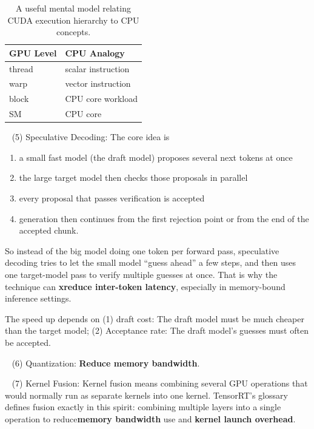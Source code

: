 \documentclass[11pt]{article}  %
\begin{document}
\begin{table}[h]
\centering
\begin{tabular}{ll}
\hline
\textbf{GPU Level} & \textbf{CPU Analogy} \\
\hline
thread & scalar instruction \\
warp & vector instruction \\
block & CPU core workload \\
SM & CPU core \\
\hline
\end{tabular}
\caption{A useful mental model relating CUDA execution hierarchy to CPU concepts.}
\end{table}


\textbullet~ (5) Speculative Decoding:
The core idea is 
\begin{enumerate}
  \item a small fast model (the draft model) proposes several next tokens at once
  \item the large target model then checks those proposals in parallel
  \item every proposal that passes verification is accepted
  \item generation then continues from the first rejection point or from the end of the accepted chunk.
\end{enumerate}
So instead of the big model doing one token per forward pass, speculative decoding tries to let the small model ``guess ahead'' a few steps, and then uses one target-model pass to verify multiple guesses at once.
That is why the technique can \textbf{xreduce inter-token latency}, especially in memory-bound inference settings.

The speed up depends on (1) draft cost: The draft model must be much cheaper than the target model;
(2) Acceptance rate: The draft model's guesses must often be accepted.


\textbullet~ (6) Quantization: \textbf{Reduce memory bandwidth}.

\textbullet~ (7) Kernel Fusion: Kernel fusion means combining several GPU operations that would normally run as separate kernels into one kernel. TensorRT's glossary defines fusion exactly in this spirit: combining multiple layers into a single operation to reduce\textbf{memory bandwidth} use and \textbf{kernel launch overhead}.
\end{document}
